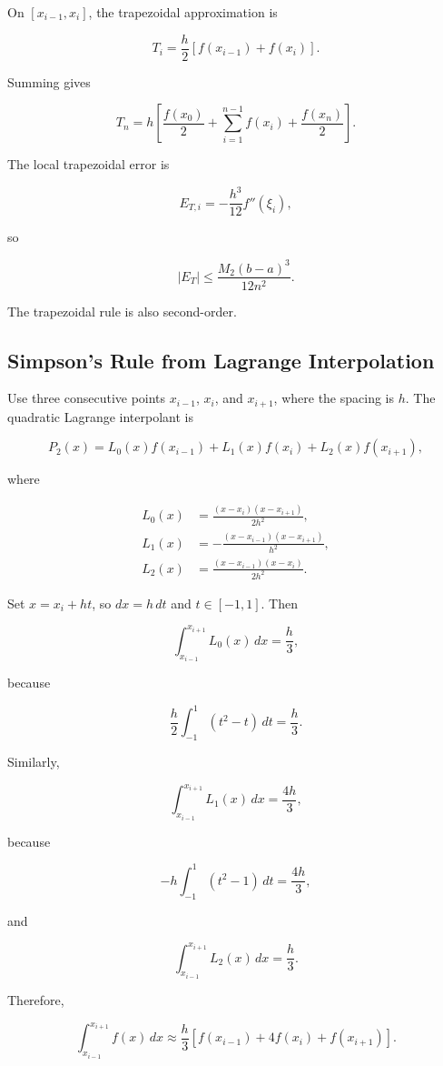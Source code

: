 \documentclass[12pt, a4paper]{article}
\theoremstyle{break}
\begin{document}
On \([x_{i-1},x_i]\), the trapezoidal approximation is

\[
T_i=\frac h2[f(x_{i-1})+f(x_i)].
\]

Summing gives

\[
T_n=h\left[\frac{f(x_0)}2+\sum_{i=1}^{n-1}f(x_i)+\frac{f(x_n)}2\right].
\]

The local trapezoidal error is

\[
E_{T,i}=-\frac{h^3}{12}f''(\xi_i),
\]

so

\[
|E_T|\le\frac{M_2(b-a)^3}{12n^2}.
\]

The trapezoidal rule is also second-order.

\subsection{Simpson's Rule from Lagrange Interpolation}\label{simpsons-rule-from-lagrange-interpolation}

Use three consecutive points \(x_{i-1}\), \(x_i\), and \(x_{i+1}\), where the spacing is \(h\). The quadratic Lagrange interpolant is

\[
P_2(x)=L_0(x)f(x_{i-1})+L_1(x)f(x_i)+L_2(x)f(x_{i+1}),
\]

where

\[
\begin{aligned}
L_0(x)&=\frac{(x-x_i)(x-x_{i+1})}{2h^2},\\
L_1(x)&=-\frac{(x-x_{i-1})(x-x_{i+1})}{h^2},\\
L_2(x)&=\frac{(x-x_{i-1})(x-x_i)}{2h^2}.
\end{aligned}
\]

Set \(x=x_i+ht\), so \(dx=h\,dt\) and \(t\in[-1,1]\). Then

\[
\int_{x_{i-1}}^{x_{i+1}}L_0(x)\,dx=\frac h3,
\]

because

\[
\frac h2\int_{-1}^1(t^2-t)\,dt=\frac h3.
\]

Similarly,

\[
\int_{x_{i-1}}^{x_{i+1}}L_1(x)\,dx=\frac{4h}{3},
\]

because

\[
-h\int_{-1}^1(t^2-1)\,dt=\frac{4h}{3},
\]

and

\[
\int_{x_{i-1}}^{x_{i+1}}L_2(x)\,dx=\frac h3.
\]

Therefore,

\[
\int_{x_{i-1}}^{x_{i+1}}f(x)\,dx
\approx\frac h3[f(x_{i-1})+4f(x_i)+f(x_{i+1})].
\]
\end{document}
